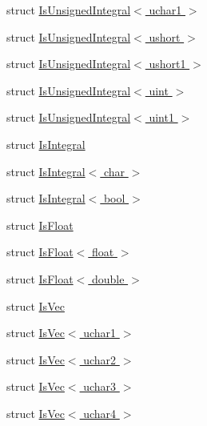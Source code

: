 \begin{DoxyCompactItemize}
\item 
struct \hyperlink{structcv_1_1gpu_1_1device_1_1type__traits__detail_1_1IsUnsignedIntegral_3_01uchar1_01_4}{Is\-Unsigned\-Integral$<$ uchar1 $>$}
\item 
struct \hyperlink{structcv_1_1gpu_1_1device_1_1type__traits__detail_1_1IsUnsignedIntegral_3_01ushort_01_4}{Is\-Unsigned\-Integral$<$ ushort $>$}
\item 
struct \hyperlink{structcv_1_1gpu_1_1device_1_1type__traits__detail_1_1IsUnsignedIntegral_3_01ushort1_01_4}{Is\-Unsigned\-Integral$<$ ushort1 $>$}
\item 
struct \hyperlink{structcv_1_1gpu_1_1device_1_1type__traits__detail_1_1IsUnsignedIntegral_3_01uint_01_4}{Is\-Unsigned\-Integral$<$ uint $>$}
\item 
struct \hyperlink{structcv_1_1gpu_1_1device_1_1type__traits__detail_1_1IsUnsignedIntegral_3_01uint1_01_4}{Is\-Unsigned\-Integral$<$ uint1 $>$}
\item 
struct \hyperlink{structcv_1_1gpu_1_1device_1_1type__traits__detail_1_1IsIntegral}{Is\-Integral}
\item 
struct \hyperlink{structcv_1_1gpu_1_1device_1_1type__traits__detail_1_1IsIntegral_3_01char_01_4}{Is\-Integral$<$ char $>$}
\item 
struct \hyperlink{structcv_1_1gpu_1_1device_1_1type__traits__detail_1_1IsIntegral_3_01bool_01_4}{Is\-Integral$<$ bool $>$}
\item 
struct \hyperlink{structcv_1_1gpu_1_1device_1_1type__traits__detail_1_1IsFloat}{Is\-Float}
\item 
struct \hyperlink{structcv_1_1gpu_1_1device_1_1type__traits__detail_1_1IsFloat_3_01float_01_4}{Is\-Float$<$ float $>$}
\item 
struct \hyperlink{structcv_1_1gpu_1_1device_1_1type__traits__detail_1_1IsFloat_3_01double_01_4}{Is\-Float$<$ double $>$}
\item 
struct \hyperlink{structcv_1_1gpu_1_1device_1_1type__traits__detail_1_1IsVec}{Is\-Vec}
\item 
struct \hyperlink{structcv_1_1gpu_1_1device_1_1type__traits__detail_1_1IsVec_3_01uchar1_01_4}{Is\-Vec$<$ uchar1 $>$}
\item 
struct \hyperlink{structcv_1_1gpu_1_1device_1_1type__traits__detail_1_1IsVec_3_01uchar2_01_4}{Is\-Vec$<$ uchar2 $>$}
\item 
struct \hyperlink{structcv_1_1gpu_1_1device_1_1type__traits__detail_1_1IsVec_3_01uchar3_01_4}{Is\-Vec$<$ uchar3 $>$}
\item 
struct \hyperlink{structcv_1_1gpu_1_1device_1_1type__traits__detail_1_1IsVec_3_01uchar4_01_4}{Is\-Vec$<$ uchar4 $>$}

\end{DoxyCompactItemize}
